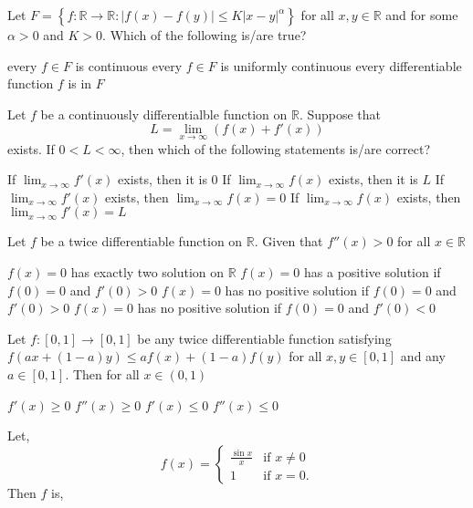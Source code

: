 \documentclass[10pt]{exam}
\newcommand{\R}{\ensuremath{\mathbb{R}}}
\begin{document}
\begin{questions}
\question
Let $F=\left \{f:\R \rightarrow \R: \vert f(x)-f(y)\vert \leq K\vert x-y \vert^{\alpha} \right \}$ for all $x,y \in \R$ and for some $\alpha >0$ and $K >0$. Which of the following is/are true?

\begin{checkboxes}
\choice every $f \in F$ is continuous
\choice every $f \in F$ is uniformly continuous
\choice every differentiable function $f$ is in $F$ 
\end{checkboxes}

\question 
Let $f$ be a continuously differentialble function on $\mathbb{R}$. Suppose that 
$$ L = \lim_{x \rightarrow \infty}(f(x)+f'(x))  $$
exists. If $0 < L < \infty $, then which of the following statements is/are correct?

\begin{checkboxes}
\choice If $\lim_{x\rightarrow \infty} f'(x) $ exists, then it is $0$ 
\choice If $\lim_{x\rightarrow \infty} f(x) $ exists, then it is $L$ 
\choice If $\lim_{x\rightarrow \infty} f'(x) $ exists, then $\lim_{x\rightarrow \infty}f(x) = 0$ 
\choice If $\lim_{x\rightarrow \infty} f(x) $ exists, then $\lim_{x\rightarrow \infty}f'(x) = L$ 
\end{checkboxes}


\question
Let $f$ be a twice differentiable function on $\mathbb{R}$. Given that $f''(x)>0$ for all $x \in \mathbb{R}$
\begin{choices}
\choice $f(x)=0$ has exactly two solution on $\mathbb{R}$
\choice $f(x)=0$ has a positive solution if $f(0)=0$ and $f'(0)>0$
\choice $f(x)=0$ has no positive solution if $f(0)=0$ and $f'(0)>0$
\choice $f(x)=0$ has no positive solution if $f(0)=0$ and $f'(0)<0$
\end{choices}

\question
Let $f:[0,1] \rightarrow [0,1]$ be any twice differentiable function satisfying $f(ax+(1-a)y) \leq af(x)+(1-a)f(y)$ for all $x,y \in [0,1]$ and any $a \in [0,1]$. Then for all $x \in (0,1)$

\begin{oneparchoices}
\choice $f'(x) \geq 0$
\choice $f''(x) \geq 0$
\choice $f'(x) \leq 0$
\choice $f''(x) \leq 0$
\end{oneparchoices}

\question
Let, 
\begin{equation}
f(x)=
\begin{cases}
\frac{\sin x}{x}& \text{if } x\neq 0\\
1& \text{if } x =0.
\end{cases}
\end{equation}
Then $f$ is,


\end{questions}
\end{document}
